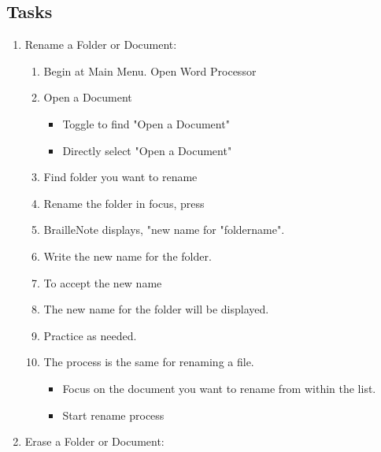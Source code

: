 \documentclass[10pt,letterpaper,twoside]{report}
\begin{document}
\subsection{Tasks}
\begin{enumerate}
	\item Rename a Folder or Document:
	      \begin{enumerate}
		      \item Begin at Main Menu. Open Word Processor 
		      \item Open a Document
		            \begin{itemize}
			            \item Toggle to find "Open a Document"  
			            \item Directly select "Open a Document" 
		            \end{itemize}
		      \item Find folder you want to rename 
		      \item Rename the folder in focus, press  
		      \item BrailleNote displays, "new name for "foldername".
		      \item Write the new name for the folder.
		      \item To accept the new name 
		      \item The new name for the folder will be displayed.
		      \item Practice as needed.
		      \item The process is the same for renaming a file.
		            \begin{itemize}
			            \item Focus on the document you want to rename from within the list.
			            \item Start rename process 
		            \end{itemize}
	      \end{enumerate}
	\item Erase a Folder or Document:
	      \begin{enumerate}

\end{enumerate}
\end{enumerate}
\end{document}
